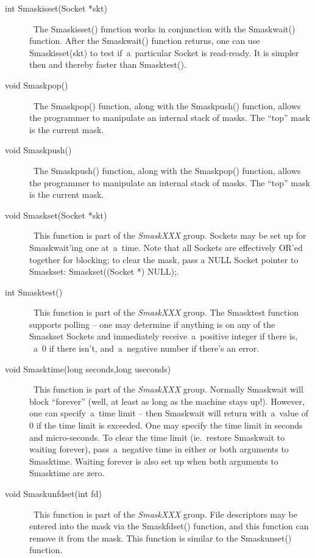 \documentclass[12pt]{article}
\begin{document}
\begin{description}
\item[int Smaskisset(Socket *skt)] \     The Smaskisset() function works in conjunction with the Smaskwait()
    function.  After the Smaskwait() function returns, one can use
    Smaskisset(skt) to test if~a~particular Socket is read-ready.  It is
    simpler then and thereby faster than Smasktest().

\item[void Smaskpop()] \     The Smaskpop() function, along with the Smaskpush() function, allows
    the programmer to manipulate an internal stack of masks.  The ``top''
    mask is the current mask.

\item[void Smaskpush()] \     The Smaskpush() function, along with the Smaskpop() function, allows
    the programmer to manipulate an internal stack of masks.  The ``top''
    mask is the current mask.

\item[void Smaskset(Socket *skt)] \     This function is part of the {\em Smask{\small XXX}} group.  Sockets may be
    set up for Smaskwait'ing one at~a~time.   Note that all Sockets are
    effectively {\small OR}'ed together for blocking; to clear the mask, pass a
    {\small NULL} Socket pointer to Smaskset:  Smaskset((Socket *) {\small
    NULL});.

\item[int Smasktest()] \     This function is part of the {\em Smask{\small XXX}} group.  The Smasktest
    function supports polling -- one may determine if anything is on any of the
    Smaskset Sockets and immediately receive~a~positive integer if there is,
   ~a~0 if there isn't, and~a~negative number if there's an error.

\item[void Smasktime(long seconds,long useconds)] \     This function is part of the {\em Smask{\small XXX}} group.
    Normally Smaskwait will block ``forever'' (well, at least as long as
    the machine stays up!).  However, one can specify~a~time limit -- then
    Smaskwait will return with~a~value of 0 if the time limit is exceeded.  One
    may specify the time limit in seconds and micro-seconds.  To clear the time
    limit (ie.~restore Smaskwait to waiting forever), pass~a~negative time in
    either or both arguments to Smasktime.  Waiting forever is also set up when
    both arguments to Smasktime are zero.

\item[void Smaskunfdset(int fd)] \     This function is part of the {\em Smask{\small XXX}} group.
    File descriptors may be entered into the mask via the Smaskfdset()
    function, and this function can remove it from the mask.  This function
    is similar to the Smaskunset() function.


\end{description}
\end{document}
